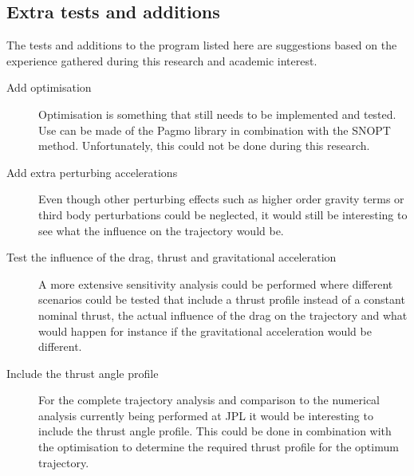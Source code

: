 \subsection{Extra tests and additions}
\label{subsec:extraTestsAndAdditions}
The tests and additions to the program listed here are suggestions based on the experience gathered during this research and academic interest. 

\begin{description}
\item[Add optimisation] Optimisation is something that still needs to be implemented and tested. Use can be made of the \ac{Pagmo} library in combination with the \ac{SNOPT} method. Unfortunately, this could not be done during this research.
\item[Add extra perturbing accelerations] Even though other perturbing effects such as higher order gravity terms or third body perturbations could be neglected, it would still be interesting to see what the influence on the trajectory would be.
\item[Test the influence of the drag, thrust and gravitational acceleration] A more extensive sensitivity analysis could be performed where different scenarios could be tested that include a thrust profile instead of a constant nominal thrust, the actual influence of the drag on the trajectory and what would happen for instance if the gravitational acceleration would be different.
\item[Include the thrust angle profile] For the complete trajectory analysis and comparison to the numerical analysis currently being performed at \ac{JPL} it would be interesting to include the thrust angle profile. This could be done in combination with the optimisation to determine the required thrust profile for the optimum trajectory.

\end{description}
